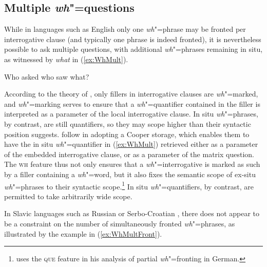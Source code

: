 \documentclass[output=paper
                ,modfonts
                ,nonflat
	        ,collection
	        ,collectionchapter
	        ,collectiontoclongg
 	        ,biblatex
                ,babelshorthands
                ,newtxmath
                ,draftmode
                ,colorlinks, citecolor=brown
]{./langsci/langscibook}
\begin{document}
{\subsection{Multiple \emph{wh}"=questions}


While in languages such as English only one \emph{wh}"=phrase may be fronted per interrogative clause (and typically one phrase is indeed fronted), it is nevertheless possible to ask multiple questions, with additional \emph{wh}"=phrases remaining in situ, as witnessed by \textit{what} in (\ref{ex:WhMult}).  

\begin{exe}
  \ex Who asked who saw what? \label{ex:WhMult}
\end{exe}

\noindent
According to the theory of \citet{Ginzburg:Sag:01}, only fillers in interrogative clauses are \emph{wh}"=marked, and \emph{wh}"=marking serves to ensure that a \emph{wh}"=quantifier contained in the filler is interpreted as a parameter of the local interrogative clause. In situ \emph{wh}"=phrases,  by contrast, are still quantifiers, so they may scope higher than their syntactic position suggests. 
\citet{Ginzburg:Sag:01} follow \citet{Pollard:Sag:94} in adopting a
Cooper storage, which enables them to have the in situ \emph{wh}"=quantifier
in (\ref{ex:WhMult}) retrieved either as a parameter of the embedded
interrogative clause, or as a parameter of the matrix question. The
\textsc{wh}  feature thus not only ensures that a \emph{wh}"=interrogative is
marked as such by a filler containing a \emph{wh}"=word, but it also fixes the
semantic scope of ex-situ %
\emph{wh}"=phrases to their syntactic
scope.\footnote{\citet{kathol:scope-marking} uses the \textsc{que}
  feature in his analysis of partial \emph{wh}"=fronting in German. } In situ \emph{wh}"=quantifiers, by contrast, are permitted to take arbitrarily wide scope. 

In Slavic languages such as Russian or Serbo-Croatian \citep{Penn:99},
there does not appear to be a constraint on the number of simultaneously fronted \emph{wh}"=phrases, as illustrated by the example in (\ref{ex:WhMultFront}). 

\begin{exe}
  \ex \label{ex:WhMultFront}
  \begin{xlist}
 

\end{xlist}
\end{exe}}
\end{document}
